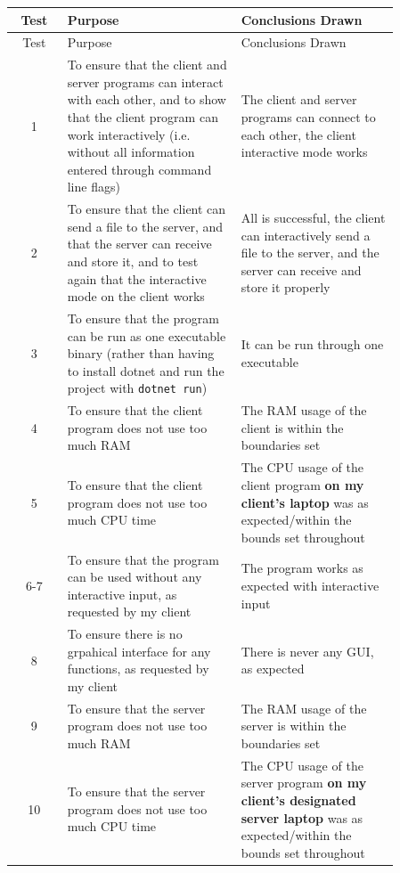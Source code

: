 \documentclass[../main.tex]{subfiles}
\begin{document}
\begin{longtable}{|c|p{0.45\linewidth}|p{0.41\linewidth}|}
    \hline
    Test & Purpose & Conclusions Drawn \\
    \hline
    \endfirsthead

    \hline
    Test & Purpose & Conclusions Drawn \\
    \hline
    \endhead

    \hline
    \endfoot

    \hline
    \endlastfoot

    1 & To ensure that the client and server programs can interact with each other, and to show that the client program can work interactively (i.e. without all information entered through command line flags) & The client and server programs can connect to each other, the client interactive mode works \\
    \hline
    2 & To ensure that the client can send a file to the server, and that the server can receive and store it, and to test again that the interactive mode on the client works & All is successful, the client can interactively send a file to the server, and the server can receive and store it properly \\
    \hline
    3 & To ensure that the program can be run as one executable binary (rather than having to install dotnet and run the project with \texttt{dotnet run}) & It can be run through one executable \\
    \hline
    4 & To ensure that the client program does not use too much RAM & The RAM usage of the client is within the boundaries set \\
    \hline
    5 & To ensure that the client program does not use too much CPU time & The CPU usage of the client program \textbf{on my client's laptop} was as expected/within the bounds set throughout \\
    \hline
    6-7 & To ensure that the program can be used without any interactive input, as requested by my client & The program works as expected with interactive input \\
    \hline
    8 & To ensure there is no grpahical interface for any functions, as requested by my client & There is never any GUI, as expected \\
    \hline
    9 & To ensure that the server program does not use too much RAM & The RAM usage of the server is within the boundaries set \\
    \hline
    10 & To ensure that the server program does not use too much CPU time & The CPU usage of the server program \textbf{on my client's designated server laptop} was as expected/within the bounds set throughout \\

\end{longtable}
\end{document}
